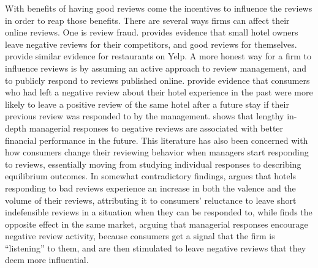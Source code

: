\documentclass[
  12pt,
  pagebackref]{article}
\begin{document}
With benefits of having good reviews come the incentives to influence
the reviews in order to reap those benefits. There are several ways
firms can affect their online reviews. One is review fraud.
\citet{Mayzlin14} provides evidence that small hotel owners leave
negative reviews for their competitors, and good reviews for themselves.
\citet{LucaZervas16} provide similar evidence for restaurants on Yelp. A
more honest way for a firm to influence reviews is by assuming an active
approach to review management, and to publicly respond to reviews
published online. \citet{GuYe14} provide evidence that consumers who had
left a negative review about their hotel experience in the past were
more likely to leave a positive review of the same hotel after a future
stay if their previous review was responded to by the management.
\citet{XieEtAl17} shows that lengthy in-depth managerial responses to
negative reviews are associated with better financial performance in the
future. This literature has also been concerned with how consumers
change their reviewing behavior when managers start responding to
reviews, essentially moving from studying individual responses to
describing equilibrium outcomes. In somewhat contradictory findings,
\citet{ProserpioZervas17} argues that hotels responding to bad reviews
experience an increase in both the valence and the volume of their
reviews, attributing it to consumers' reluctance to leave short
indefensible reviews in a situation when they can be responded to, while
\citet{ChevalierEtAl18} finds the opposite effect in the same market,
arguing that managerial responses encourage negative review activity,
because consumers get a signal that the firm is ``listening'' to them,
and are then stimulated to leave negative reviews that they deem more
influential.
\end{document}
